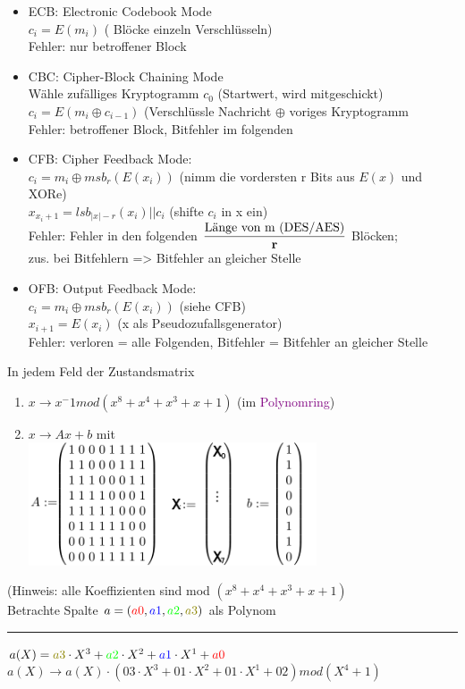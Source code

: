 \begin{itemize}%
\item ECB: Electronic Codebook Mode \\
			$c_i = E(m_i)$		( Blöcke einzeln Verschlüsseln)\\
			Fehler: nur betroffener Block
\item CBC: Cipher-Block Chaining Mode	\\
			Wähle zufälliges Kryptogramm $c_0$		(Startwert, wird mitgeschickt)\\
			$c_i = E(m_i \oplus c_{i-1})$			(Verschlüssle Nachricht $\oplus$ voriges Kryptogramm\\
			Fehler: betroffener Block, Bitfehler im folgenden
\item CFB: Cipher Feedback Mode: \\
			$c_i = m_i \oplus msb_r(E(x_i))$	(nimm die vordersten r Bits aus $E(x)$ und XORe)\\
			$x_{x_i+1} = lsb_{|x|-r}(x_i) || c_i$      (shifte $c_i$ in x ein)\\
			Fehler: Fehler in den folgenden $\dfrac{\text{Länge von m (DES/AES)}}{\text{\textbf{r}}}$ Blöcken; \\
			zus. bei Bitfehlern => Bitfehler an gleicher Stelle
\item OFB: Output Feedback Mode:\\
			$c_i = m_i \oplus msb_r(E(x_i))$ 	(siehe CFB)\\
			$x_{i+1} = E(x_i)		$		(x als Pseudozufallsgenerator)\\
			Fehler: verloren = alle Folgenden, Bitfehler = Bitfehler an gleicher Stelle
\end{itemize}




\newcommand{\Generate}{(x^8 + x^4 + x^3 +x +1)}

In jedem Feld der Zustandsmatrix
\begin{enumerate}
\item $x \rightarrow x^-1 mod \Generate $ (\Euklid im \textcolor{purple}{Polynomring})
\item $x \rightarrow Ax +b$ mit \\ \includegraphics[width=23em]{AES}
\end{enumerate}

\newcommand{\ao}{\textcolor{red}{a0}}
\newcommand{\ai}{\textcolor{blue}{a1}}
\newcommand{\aii}{\textcolor{green}{a2}}
\newcommand{\aiii}{\textcolor{olive}{a3}}

(Hinweis: alle Koeffizienten sind mod $\Generate$\\
Betrachte Spalte $a=(\ao,\ai,\aii,\aiii)$ als Polynom \\
\rule{0.5cm}{0pt} $a(X)= \aiii \cdot X^3 + \aii \cdot X^2 + \ai \cdot X^1 + \ao$\\
$a(X) \rightarrow a(X) \cdot ( 03 \cdot X^3 + 01 \cdot X^2 + 01 \cdot X^1 + 02) mod (X^4 +1)$